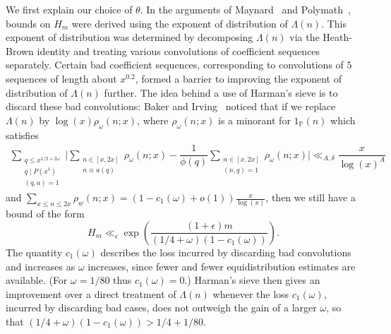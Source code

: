 \documentclass{amsart}
\numberwithin{equation}{section}
\begin{document}
We first explain our choice of $\theta$. In the arguments of Maynard~\cite{Maynard:2015:SGP} and Polymath~\cite{Polymath:2014:VSS}, bounds on $H_m$ were derived using the exponent of distribution of $\Lambda(n)$. This exponent of distribution was determined by decomposing $\Lambda(n)$ via the Heath-Brown identity and treating various convolutions of coefficient sequences separately. Certain bad coefficient sequences, corresponding to convolutions of $5$ sequences of length about $x^{0.2}$,  formed a barrier to improving the exponent of distribution of $\Lambda(n)$ further. The idea behind a use of Harman's sieve is to discard these bad convolutions: 
Baker and Irving~\cite{Baker:2017:BIP} noticed that if we replace $\Lambda(n)$ by $\log(x) \rho_\omega(n;x)$, where $\rho_\omega(n;x)$ is a minorant for $1_{\mathbb{P}}(n)$ which satisfies 
\begin{align} 
\sum_{\substack{ q \leq x^{1/2 +2\omega } \\ q \mid P(x^\delta) \\ (q,a)=1}} \Bigg| \sum_{\substack{ n \in [x,2x] \\ n \equiv a (q) }} \rho_\omega(n;x) - \dfrac{1}{\phi(q)}\sum_{\substack{ n \in [x,2x] \\ (n,q)=1 }} \rho_\omega(n;x)   \Bigg| \ll_{A,  \delta} \dfrac{x}{\log(x)^A}
\end{align} 
and  $\sum_{x \leq n \leq 2x} \rho_w(n;x) = (1- c_1(\omega) +o(1))\frac{x}{\log(x)}$, then we still have a bound of the form
$$H_m \ll_\epsilon  \exp\left(\frac{(1+\epsilon)m}{(1/4+\omega)(1-c_1(\omega))} \right).$$
 The quantity $c_1(\omega)$ describes the loss incurred by discarding bad convolutions and increases as $\omega$ increases, since fewer and fewer equidistribution estimates are available. (For $\omega = 1/80$ thus $c_1(\omega)=0$.)
Harman's sieve then gives an improvement over a direct treatment of $\Lambda(n)$ whenever the loss $c_1(\omega)$, incurred by discarding bad cases, does not outweigh the gain of a larger $\omega$, so that $(1/4+\omega)(1-c_1(\omega))>1/4+1/80$. 
\end{document}
